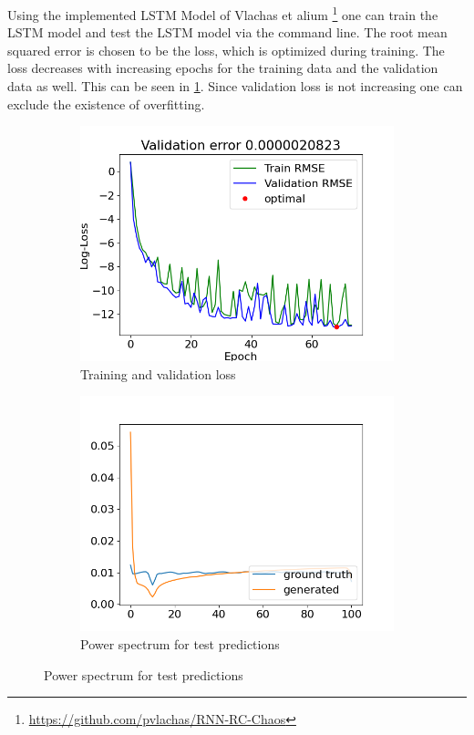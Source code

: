 Using the implemented LSTM Model of Vlachas et alium \cite{Vlachas}\footnote{\url{https://github.com/pvlachas/RNN-RC-Chaos}} one can train the LSTM model and test the LSTM model via the command line. The root mean squared error is chosen to be the loss, which is optimized during training. The loss decreases with increasing epochs for the training data and the validation data as well. This can be seen in \cref{2:loss}. Since validation loss is not increasing one can exclude the existence of overfitting.
\begin{figure}[h]
	\centering
	\begin{subfigure}[b]{0.45\textwidth}
		\includegraphics[width=\textwidth]{../Results/Test-Task02/Figures/RNN-lstm-RDIM_1-N_used_50000-NUM-LAY_1-SIZE-LAY_100-ACT_tanh-ISH_statefull-SL_8-PL_4-LR_0.001-DKP_1.0-ZKP_1.0-HSPL_300-IPL_200-NL_1-WID_0/Loss_total_log.png}
		\caption{Training and validation loss}
		\label{2:loss}
	\end{subfigure}
	\begin{subfigure}[b]{0.45\textwidth}
		\includegraphics[width=\textwidth]{../Results/Test-Task02/Figures/RNN-lstm-RDIM_1-N_used_50000-NUM-LAY_1-SIZE-LAY_100-ACT_tanh-ISH_statefull-SL_8-PL_4-LR_0.001-DKP_1.0-ZKP_1.0-HSPL_300-IPL_200-NL_1-WID_0/spectrum_comparison_TEST.png}
		\caption{Power spectrum for test predictions}
		\label{2:spectrum}
	\end{subfigure}
\end{figure}

